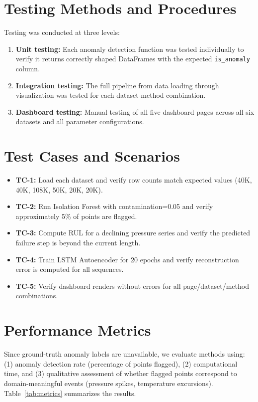 \documentclass{CLS_zhou430}
\begin{document}
\section{Testing Methods and Procedures}
Testing was conducted at three levels:
\begin{enumerate}
    \item \textbf{Unit testing:} Each anomaly detection function was tested individually to verify it returns correctly shaped DataFrames with the expected \texttt{is\_anomaly} column.
    \item \textbf{Integration testing:} The full pipeline from data loading through visualization was tested for each dataset-method combination.
    \item \textbf{Dashboard testing:} Manual testing of all five dashboard pages across all six datasets and all parameter configurations.
\end{enumerate}

\section{Test Cases and Scenarios}
\begin{itemize}
    \item \textbf{TC-1:} Load each dataset and verify row counts match expected values (40K, 40K, 108K, 50K, 20K, 20K).
    \item \textbf{TC-2:} Run Isolation Forest with contamination=0.05 and verify approximately 5\% of points are flagged.
    \item \textbf{TC-3:} Compute RUL for a declining pressure series and verify the predicted failure step is beyond the current length.
    \item \textbf{TC-4:} Train LSTM Autoencoder for 20 epochs and verify reconstruction error is computed for all sequences.
    \item \textbf{TC-5:} Verify dashboard renders without errors for all page/dataset/method combinations.
\end{itemize}

\section{Performance Metrics}
Since ground-truth anomaly labels are unavailable, we evaluate methods using: (1) anomaly detection rate (percentage of points flagged), (2) computational time, and (3) qualitative assessment of whether flagged points correspond to domain-meaningful events (pressure spikes, temperature excursions). Table~\ref{tab:metrics} summarizes the results.
\end{document}
